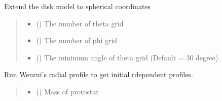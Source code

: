 \documentclass[a4paper,11pt,english]{sphinxmanual}
\begin{document}
\begin{fulllineitems}
\begin{fulllineitems}
\label{\detokenize{vertical:spherical_x22.DiskModel_spherical.extend_to_spherical}}
\pysigstartsignatures
\pysiglinewithargsret
{}
{\sphinxparamcomma {}\sphinxparamcomma {}}
{}
\pysigstopsignatures
\sphinxAtStartPar
Extend the disk model to spherical coordinates
\begin{quote}\begin{description}
\begin{itemize}
\item {} 
\sphinxAtStartPar
{} () \textendash{} The number of theta grid

\item {} 
\sphinxAtStartPar
{} () \textendash{} The number of phi grid

\item {} 
\sphinxAtStartPar
{} () \textendash{} The minimum angle of theta grid (Default = 30 degree)

\end{itemize}

\end{description}\end{quote}

\end{fulllineitems}


\begin{fulllineitems}
\label{\detokenize{vertical:spherical_x22.DiskModel_spherical.input_disk_parameter}}
\pysigstartsignatures
\pysiglinewithargsret
{}
{\sphinxparamcomma {}\sphinxparamcomma {}\sphinxparamcomma {}\sphinxparamcomma {}}
{}
\pysigstopsignatures
\sphinxAtStartPar
Run Wenrui’s radial profile to get initial r\sphinxhyphen{}dependent profiles.
\begin{quote}\begin{description}
\begin{itemize}
\item {} 
\sphinxAtStartPar
{} () \textendash{} Mass of protostar


\end{itemize}
\end{description}
\end{quote}
\end{fulllineitems}
\end{fulllineitems}
\end{document}

